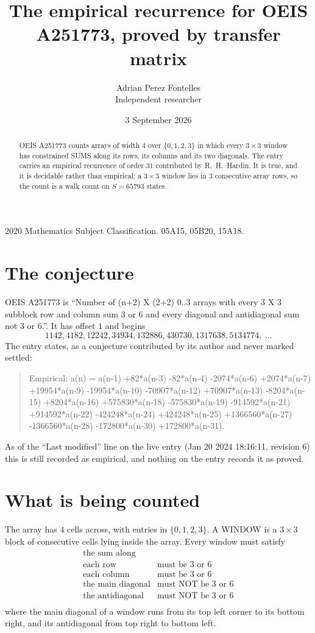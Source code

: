 \documentclass[11pt,a4paper]{article}
\title{The empirical recurrence for OEIS A251773, proved by transfer matrix}
\author{Adrian Perez Fontelles\\ \small Independent researcher}
\date{3 September 2026}
\theoremstyle{plain}
\theoremstyle{definition}
\begin{document}
\maketitle

\begin{abstract}
OEIS A251773 counts arrays of width $4$ over $\{0,1,2,3\}$ in which every $3\times3$ window has
constrained SUMS along its rows, its columns and its two diagonals. The entry carries an
empirical recurrence of order $31$ contributed by R.~H.~Hardin. It is true, and it is
decidable rather than empirical: a $3\times3$ window lies in $3$ consecutive array rows,
so the count is a walk count on $S=65793$ states.
\end{abstract}

\noindent\small 2020 Mathematics Subject Classification. 05A15, 05B20, 15A18.\normalsize

\section{The conjecture}

OEIS A251773 is ``Number of (n+2) X (2+2) 0..3 arrays with every 3 X 3 subblock row and column sum 3 or 6 and every diagonal and antidiagonal sum not 3 or 6.''. It has offset $1$ and begins
\[
1142, 4182, 12242, 34934, 132886, 430730, 1317638, 5134774,\ \dots
\]
The entry states, as a conjecture contributed by its author and never marked settled:
\begin{quote}
Empirical: a(n) = a(n-1) +82*a(n-3) -82*a(n-4) -2074*a(n-6) +2074*a(n-7) +19954*a(n-9) -19954*a(n-10) -70907*a(n-12) +70907*a(n-13) -8204*a(n-15) +8204*a(n-16) +575830*a(n-18) -575830*a(n-19) -914592*a(n-21) +914592*a(n-22) -424248*a(n-24) +424248*a(n-25) +1366560*a(n-27) -1366560*a(n-28) -172800*a(n-30) +172800*a(n-31).
\end{quote}
As of the ``Last modified'' line on the live entry (Jan 20 2024 18:16:11, revision 6) this is still
recorded as empirical, and nothing on the entry records it as proved.

\section{What is being counted}

The array has $4$ cells across, with entries in $\{0,1,2,3\}$. A WINDOW is a $3\times3$ block
of consecutive cells lying inside the array. Every window must satisfy
\[
\begin{array}{ll}
\text{the sum along} & \text{} \\[2pt]
\text{each row} & \text{must be 3 or 6} \\
\text{each column} & \text{must be 3 or 6} \\
\text{the main diagonal} & \text{must NOT be 3 or 6} \\
\text{the antidiagonal} & \text{must NOT be 3 or 6} \\
\end{array}
\]
where the main diagonal of a window runs from its top left corner to its bottom right, and its
antidiagonal from top right to bottom left.
\end{document}
